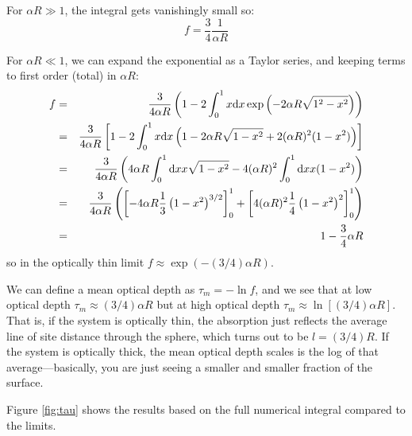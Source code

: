 \documentclass[11pt, preprint]{article}
\begin{document}
\begin{enumerate}
\begin{enumerate}
\begin{answer}
        For $\alpha R\gg 1$, the integral gets vanishingly small so:
        \begin{equation}
          f = \frac{3}{4} \frac{1}{\alpha R}
        \end{equation}
        
        For $\alpha R\ll 1$, we can expand the exponential as a Taylor
        series, and keeping terms to first order (total) in $\alpha R$:
        \begin{eqnarray}
          f
          &=& \frac{3}{4 \alpha R}
          \left(1 - 2 \int_0^1 x {\rm d}x 
              \exp\left(-2 \alpha R \sqrt{1^2 - x^2}\right)\right) \cr
          &=& \frac{3}{4 \alpha R}
          \left[1 - 2 \int_0^1 x {\rm d}x  \left( 1 - 2\alpha R
          \sqrt{1-x^2} + 2 (\alpha R)^2 (1-x^2)\right) \right]\cr
          &=& \frac{3}{4 \alpha R}
          \left( 4 \alpha R \int_0^1 {\rm d}x x \sqrt{1-x^2}
          - 4 (\alpha R)^2 \int_0^1 {\rm d}x x (1-x^2)\right) \cr
          &=& \frac{3}{4 \alpha R}
          \left( \left[- 4 \alpha R \frac{1}{3}\left(1 -
            x^2\right)^{3/2} \right]_0^1
          + \left[4 (\alpha R)^2 \frac{1}{4}\left(1 -
          x^2\right)^2\right]_0^1\right) \cr
          &=& 1 - \frac{3}{4} \alpha R
        \end{eqnarray}
        so in the optically thin limit $f\approx \exp(-(3/4) \alpha
        R)$.

        We can define a mean optical depth as $\tau_m = - \ln f$, and
        we see that at low optical depth $\tau_m \approx (3/4) \alpha
        R$ but at high optical depth $\tau_m \approx \ln[(3/4) \alpha
          R]$. That is, if the system is optically thin, the
        absorption just reflects the average line of site distance
        through the sphere, which turns out to be $l = (3/4) R$. If
        the system is optically thick, the mean optical depth scales
        is the log of that average---basically, you are just seeing a
        smaller and smaller fraction of the surface.

        Figure \ref{fig:tau} shows the results based on the full
        numerical integral compared to the limits.


\end{answer}
\end{enumerate}
\end{enumerate}
\end{document}
